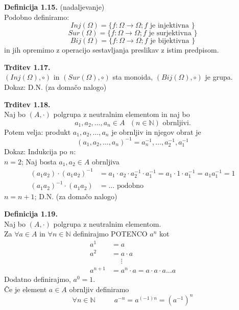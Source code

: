 \documentclass[12pt]{article}
\begin{document}
\vspace*{24pt}


\noindent
\textbf{Definicija 1.15.} (nadaljevanje) \\
Podobno definiramo: 
$$Inj(\Omega) = \{ f: \Omega \to \Omega ; f \text{ je injektivna }\}$$
$$Sur(\Omega) = \{ f: \Omega \to \Omega ; f \text{ je surjektivna } \}$$
$$Bij(\Omega) = \{ f: \Omega \to \Omega ; f \text{ je bijektivna } \}$$
in jih opremimo z operacijo sestavljanja preslikav z istim predpisom.



\vspace*{24pt}


\noindent
\textbf{Trditev 1.17.} \\
$(Inj(\Omega), \circ)$ in $(Sur(\Omega), \circ)$ sta monoida, $(Bij(\Omega), \circ)$ je grupa. \\[1em]
Dokaz: D.N. (za domačo nalogo)



\vspace*{24pt}


\noindent
\textbf{Trditev 1.18.} \\
Naj bo $(A, \cdot)$ polgrupa z neutralnim elementom in naj bo 
$$a_1, a_2, \dots, a_n \in A \text{ } (n \in \mathbb{N}) \text{ obrnljivi.}$$
Potem velja: produkt $a_1, a_2, \dots, a_n$ je obrnljiv in njegov obrat je 
$$(a_1, a_2, \dots, a_n)^{-1} = a_n^{-1}, \dots, a_2^{-1}, a_1^{-1}$$
Dokaz: Indukcija po $n$: \\
$n = 2$; Naj bosta $a_1, a_2 \in A$ obrnljiva
\begin{align*}
    (a_1a_2)\cdot (a_1a_2)^{-1} &= a_1 \cdot a_2 \cdot a_2^{-1} \cdot a_1^{-1} = a_1 \cdot 1 \cdot a_1^{-1} = a_1a_1^{-1} = 1 \\
    (a_1a_2)^{-1} \cdot (a_1a_2) &= \dots \text{ podobno }
\end{align*}
$n = n + 1$; D.N. (za domačo nalogo)



\vspace*{24pt}


\noindent
\textbf{Definicija 1.19.} \\
Naj bo $(A, \cdot)$ polgrupa z neutralnim elementom. \\
Za $\forall a \in A$ in $\forall n \in \mathbb{N}$ definirajmo POTENCO $a^n$ kot
\begin{align*}
    a^1 &= a \\
    a^2 &= a \cdot a \\
    &\phantom{=} \vdots \\
    a^{n+1} &= a^n \cdot a = a \cdot a \cdot a \dots a 
\end{align*}
Dodatno definirajmo, $a^0 = 1$. \\
Če je element $a \in A$ obrnljiv definiramo
$$
\forall n \in \mathbb{N} \text{ } \text{ } \text{ } \text{ } a^{-n} = a^{(-1)n} = (a^{-1})^n
$$
\end{document}
